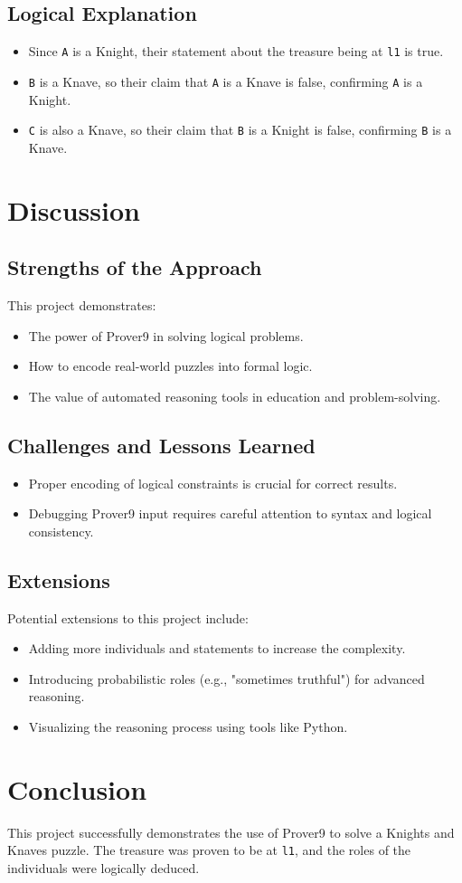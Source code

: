 \documentclass[a4paper,12pt]{article}
\begin{document}
\subsection{Logical Explanation}
\begin{itemize}
    \item Since \texttt{A} is a Knight, their statement about the treasure being at \texttt{l1} is true.
    \item \texttt{B} is a Knave, so their claim that \texttt{A} is a Knave is false, confirming \texttt{A} is a Knight.
    \item \texttt{C} is also a Knave, so their claim that \texttt{B} is a Knight is false, confirming \texttt{B} is a Knave.
\end{itemize}

\section{Discussion}
\subsection{Strengths of the Approach}
This project demonstrates:
\begin{itemize}
    \item The power of Prover9 in solving logical problems.
    \item How to encode real-world puzzles into formal logic.
    \item The value of automated reasoning tools in education and problem-solving.
\end{itemize}

\subsection{Challenges and Lessons Learned}
\begin{itemize}
    \item Proper encoding of logical constraints is crucial for correct results.
    \item Debugging Prover9 input requires careful attention to syntax and logical consistency.
\end{itemize}

\subsection{Extensions}
Potential extensions to this project include:
\begin{itemize}
    \item Adding more individuals and statements to increase the complexity.
    \item Introducing probabilistic roles (e.g., "sometimes truthful") for advanced reasoning.
    \item Visualizing the reasoning process using tools like Python.
\end{itemize}

\section{Conclusion}
This project successfully demonstrates the use of Prover9 to solve a Knights and Knaves puzzle. The treasure was proven to be at \texttt{l1}, and the roles of the individuals were logically deduced.
\end{document}
